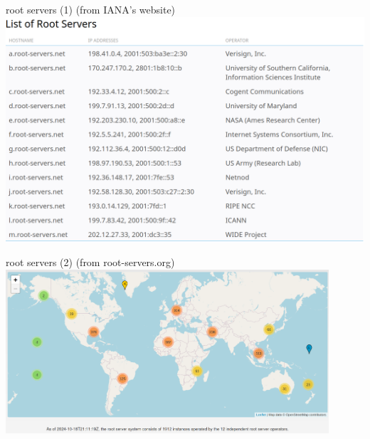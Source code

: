 \begin{frame}{root servers (1)}
(from IANA's website)
\includegraphics[height=0.8\textheight]{iana-root-server-list}
\end{frame}

\begin{frame}{root servers (2)}
(from root-servers.org)
\includegraphics[width=0.9\textwidth]{root-servers-map}
\end{frame}

